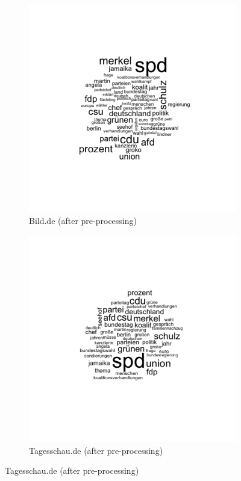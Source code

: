 \documentclass[12pt,a4paper,notitlepage]{article}
\begin{document}
\begin{figure}[H]\label{fig_wordcloud2}
	\caption{Wordclouds}
	\begin{center}
		\begin{subfigure}[normla]{0.48\textwidth}
			\includegraphics[width=\textwidth]{../figs/wordclouds/Bild.de.png}
			\caption{Bild.de (after pre-processing)}
		\end{subfigure}
		\begin{subfigure}[normla]{0.48\textwidth}
			\includegraphics[width=\textwidth]{../figs/wordclouds/tagesschau.de.png}
			\caption{Tagesschau.de (after pre-processing)}
		\end{subfigure}
	\end{center}
\end{figure}
\end{document}
